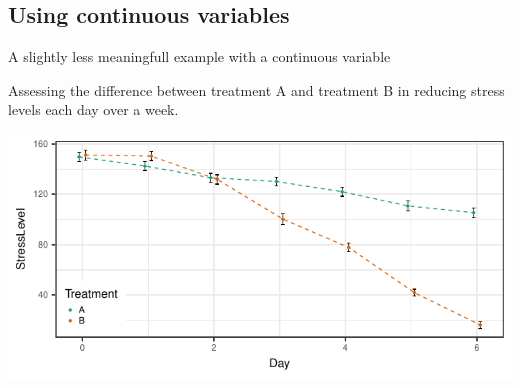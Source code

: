 \documentclass{beamer}
\begin{document}
\subsection{Using continuous variables}

\begin{frame}{A slightly less meaningfull example with a continuous variable}

	\vfill
	Assessing the difference between treatment A and treatment B in reducing stress levels each day over a week.
	\pause
	\vfill
	
	\begin{center}
		\includegraphics{../src/Continuous.pdf}
	\end{center}
	\vfill

\end{frame}
\end{document}
